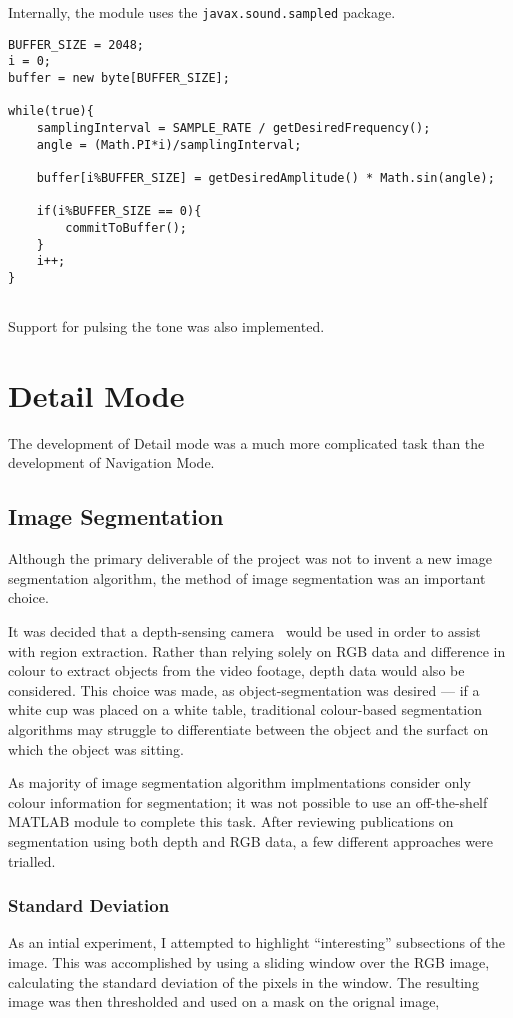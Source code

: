 Internally, the module uses the \texttt{javax.sound.sampled} package. 

\begin{verbatim}
BUFFER_SIZE = 2048;
i = 0;
buffer = new byte[BUFFER_SIZE];

while(true){
    samplingInterval = SAMPLE_RATE / getDesiredFrequency();
    angle = (Math.PI*i)/samplingInterval;

    buffer[i%BUFFER_SIZE] = getDesiredAmplitude() * Math.sin(angle);

    if(i%BUFFER_SIZE == 0){
        commitToBuffer();
    }
    i++;
}
    
\end{verbatim}

Support for pulsing the tone was also implemented. 

\section{Detail Mode}
The development of Detail mode was a much more complicated task than the development of Navigation Mode.

\subsection{Image Segmentation}
Although the primary deliverable of the project was not to invent a new image segmentation algorithm, the method of image segmentation was an important choice.

It was decided that a depth-sensing camera~\cite{xtion} would be used in order to assist with region extraction. Rather than relying solely on RGB data and difference in colour to extract objects from the video footage, depth data would also be considered. This choice was made, as object-segmentation was desired --- if a white cup was placed on a white table, traditional colour-based segmentation algorithms may struggle to differentiate between the object and the surfact on which the object was sitting.

As majority of image segmentation algorithm implmentations consider only colour information for segmentation; it was not possible to use an off-the-shelf MATLAB module to complete this task. After reviewing publications on segmentation using both depth and RGB data, a few different approaches were trialled.

\subsubsection{Standard Deviation}
As an intial experiment, I attempted to highlight ``interesting'' subsections of the image. This was accomplished by using a sliding window over the RGB image, calculating the standard deviation of the pixels in the window. The resulting image was then thresholded and used on a mask on the orignal image,

